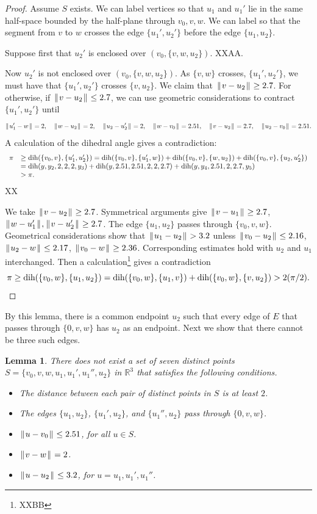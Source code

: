 \documentclass[11pt]{amsart}
\def\op#1{{\text{#1}}}
\newcommand{\ring}[1]{\mathbb{#1}}
\def\dih{\op{dih}}
\def\text{\hbox}
\def\|{{\hskip0.1em|\hskip-0.1em|\hskip0.1em}}
\newtheorem{lemma}{Lemma}
\begin{document}
\begin{proof}
Assume $S$ exists.  We can label vertices so that $u_1$ and $u_1'$ lie in the same half-space bounded by
the half-plane through $v_0,v,w$.   We can label so that the segment from $v$ to $w$ crosses the edge $\{u_1',u_2'\}$
before the edge $\{u_1,u_2\}$.

Suppose first that $u_2'$ is enclosed over $(v_0,\{v,w,u_2\})$. XXAA.

Now $u_2'$ is not enclosed over $(v_0,\{v,w,u_2\})$.  As $\{v,w\}$ crosses, $\{u_1',u_2'\}$, we must
have that $\{u_1',u_2'\}$ crosses $\{v,u_2\}$.  We claim that $\|v-u_2\|\ge 2.7$.  For otherwise,
if $\|v-u_2\|\le 2.7$, we can use geometric considerations to contract $\{u_1',u_2'\}$ until
$$
\|u_1'-w\|=2,\quad \|w-u_2\|=2,\quad \|u_2-u_2'\|=2,\quad \|w-v_0\|=2.51,\quad \|v-u_2\|=2.7,\quad \|u_2-v_0\|=2.51.
$$
A calculation of the dihedral angle gives a contradiction:
$$
\begin{array}{lll}
\pi &\ge\op{dih}(\{v_0,v\},\{u_1',u_2'\}) = \op{dih}(\{v_0,v\},\{u_1',w\})+\op{dih}(\{v_0,v\},\{w,u_2\})+\op{dih}(\{v_0,v\},\{u_2,u_2'\})\\
&=\dih(y,y_2,2,2,2,y_3)+\dih(y,2.51,2.51,2,2,2.7)+\dih(y,y_4,2.51,2,2.7,y_5) \\
  &>\pi.
\end{array}
$$
XX

We take $\|v-u_2\|\ge 2.7$.  Symmetrical arguments give $\|v-u_1\|\ge 2.7$, $\|w-u_1'\|,\|v-u_2'\|\ge 2.7$.
The edge $\{u_1,u_2\}$ passes through $\{v_0,v,w\}$.  Geometrical considerations show that $\|u_1-u_2\|>3.2$
unless $\|v_0-u_2\|\le 2.16$, $\|u_2-w\|\le 2.17$, $\|v_0-w\|\ge 2.36$.  Corresponding estimates  hold with
$u_2$ and $u_1$ interchanged.  Then a calculation\footnote{XXBB} gives a contradiction
$$
\pi \ge \op{dih}(\{v_0,w\},\{u_1,u_2\}) = \op{dih}(\{v_0,w\},\{u_1,v\}) + \op{dih}(\{v_0,w\},\{v,u_2\}) >
2 (\pi/2).
$$
\end{proof}

By this lemma, there is a common endpoint $u_2$ such that every edge
of $E$ that passes through $\{0,v,w\}$ has $u_2$ as an endpoint.
Next we show that there cannot be three such edges.

\begin{lemma}
There does not exist a set of seven distinct points
$S=\{v_0,v,w,u_1,u_1',u_1'',u_2\}$ in $\ring{R}^3$ that satisfies
the following conditions.
\begin{itemize}
\item The distance between each pair of distinct points in $S$ is at least $2$.
\item The edges $\{u_1,u_2\}$, $\{u_1',u_2\}$, and $\{u_1'',u_2\}$ pass through
$\{0,v,w\}$.
\item $\|u-v_0\|\le 2.51$, for all $u\in S$.
\item $\|v-w\|=2$.
\item $\|u-u_2\|\le 3.2$, for $u=u_1,u_1',u_1''$.
\end{itemize}
\end{lemma}
\end{document}
